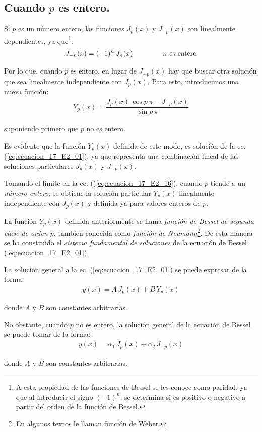 \subsection{Cuando \texorpdfstring{$p$}{p} es entero.}

Si $p$ es un número entero, las funciones $J_{p}(x)$ y $J_{-p}(x)$ son linealmente dependientes, ya que\footnote{A esta propiedad de las funciones de Bessel se les conoce como paridad, ya que al introducir el signo $(-1)^{n}$, se determina si es positivo o negativo a partir del orden de la función de Bessel.}:
\begin{align}
J_{-n}(x) = (-1)^{n} \, J_{n} (x) \hspace{1.5cm} \mbox{$n$ es entero}
\label{eq:ecuacion_E2_15}
\end{align}

Por lo que, cuando $p$ es entero, en lugar de $J_{-p}(x)$ hay que buscar otra solución que sea linealmente independiente con $J_{p}(x)$. Para esto, introducimos una nueva función:
\begin{align}
Y_{p}(x) = \dfrac{J_{p}(x) \, \cos p \, \pi - J_{-p}(x)}{\sin p \, \pi}
\label{eq:ecuacion_17_E2_16}
\end{align}

suponiendo primero que $p$ no es entero.
\par
Es evidente que la función $Y_{p}(x)$ definida de este modo, es solución de la ec. (\ref{eq:ecuacion_17_E2_01}), ya que representa una combinación lineal de las soluciones particulares $J_{p}(x)$ y $J_{-p}(x)$.
\par
Tomando el límite en la ec. ()\ref{eq:ecuacion_17_E2_16}), cuando $p$ tiende a un \emph{número entero}, se obtiene la solución particular $Y_{p}(x)$ linealmente independiente con $J_{p}(x)$ y definida ya para valores enteros de $p$.
\par
La función $Y_{p}(x)$ definida anteriormente se llama \emph{función de Bessel de segunda clase de orden $p$}, también conocida como \emph{función de Neumann}\footnote{En algunos textos le llaman función de Weber.}. De esta manera se ha construido el \emph{sistema fundamental de soluciones} de la ecuación de Bessel (\ref{eq:ecuacion_17_E2_01}).
\par
La solución general a la ec. (\ref{eq:ecuacion_17_E2_01}) se puede expresar de la forma:
\begin{align}
y(x) = A \, J_{p}(x) + B \, Y_{p}(x)
\label{eq:ecuacion_17_E2_17}
\end{align}

donde $A$ y $B$ son constantes arbitrarias.
\par
No obstante, cuando $p$ no es entero, la solución general de la ecuación de Bessel se puede tomar de la forma:
\begin{align}
y(x) = \alpha_{1} \, J_{p}(x) + \alpha_{2} \, J_{-p}(x)
\label{eq:ecuacion_17_E2_18}
\end{align}

donde $A$ y $B$ son constantes arbitrarias.    
  